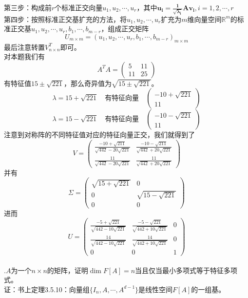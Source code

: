 \documentclass[UTF8]{ctexart}
\begin{document}
		第三步：构成前$r$个标准正交向量$u_1, u_2, \cdots, u_r$，其中$\bm{u_i = \frac{1}{\sqrt{\lambda_i}} A v_i}, i = 1, 2, \cdots, r$\\
		第四步：按照标准正交基扩充的方法，将$u_1, u_2, \cdots, u_r$扩充为$m$维向量空间$\mathbb{R}^m$的标准正交基$u_1, u_2, \cdots, u_r, b_1, \cdots, b_{m-r}$，组成正交矩阵
		\[
		U_{m \times m} = (u_1, u_2, \cdots, u_r, b_1, \cdots, b_{m-r})_{m \times m}
		\]
		最后注意转置$V_{n \times n}^T$即可。\\
		对本题我们有
		\[
		A^TA = \begin{pmatrix} 5 & 11 \\ 11 & 25 \end{pmatrix}
		\]
		有特征值$15 \pm \sqrt{221}$，那么奇异值为$\sqrt{15 \pm \sqrt{221}}$。
		\[
		\lambda = 15 + \sqrt{221} \quad \text{有特征向量} \quad \begin{pmatrix} -10 + \sqrt{221} \\ 11 \end{pmatrix}
		\]
		\[
		\lambda = 15 - \sqrt{221} \quad \text{有特征向量} \quad \begin{pmatrix} -10 - \sqrt{221} \\ 11 \end{pmatrix}
		\]
		注意到对称阵的不同特征值对应的特征向量正交，我们就得到了
		\[
		V = \begin{pmatrix} 
			
			\frac{-10+\sqrt{211}}{\sqrt{442} - 20 \sqrt{221}} & \frac{-10-\sqrt{211}}{\sqrt{442} + 20 \sqrt{221}} \\ 
			\frac{11}{\sqrt{442} - 20 \sqrt{221}} & \frac{11}{\sqrt{442} + 20 \sqrt{221}} 
		\end{pmatrix}
		\]
		并有
		\[
		\Sigma = \begin{pmatrix} 
			\sqrt{15 + \sqrt{221}} & 0 \\ 
			0 & \sqrt{15 - \sqrt{221}} \\ 
			0 & 0 
		\end{pmatrix}
		\]
		进而
		\[
		U=\left(\begin{array}{ccc}
			\frac{-5+\sqrt{221}}{\sqrt{442-10 \sqrt{221}}} & \frac{-5-\sqrt{221}}{\sqrt{442+10 \sqrt{221}}} & 0 \\
			\frac{14}{\sqrt{442-10 \sqrt{221}}} & \frac{14}{\sqrt{442+10 \sqrt{221}}} & 0 \\
			0 & 0 & 1
		\end{array}\right)
		\]\\
		
		
.$A$为一个$n \times n$的矩阵，证明$\dim F[A] = n$当且仅当最小多项式等于特征多项式。\\
证：书上定理3.5.10：向量组$\{I_n, A, \cdots, A^{d-1}\}$是线性空间$F[A]$的一组基。
		
\end{document}

